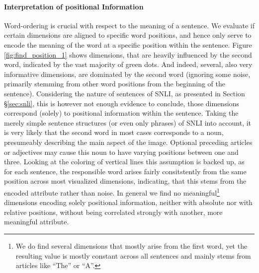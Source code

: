 \paragraph*{Interpretation of positional Information}
Word-ordering is crucial  with respect to the meaning of a sentence. We evaluate if certain dimensions are aligned to specific word positions, and hence only serve to encode the meaning of the word at a specific position within the sentence. Figure \ref{fig:find_position_1} shows dimensions, that are heavily influenced by the second word, indicated by the vast majority of green dots. And indeed, several, also very informative dimensions, are dominated by the second word (ignoring some noise, primarily stemming from other word positions from the beginning of the sentence). Considering the nature of sentences of \ac{SNLI}, as presented in Section §\ref{sec:snli}, this is however not enough evidence to conclude, those dimensions correspond (solely) to positional information within the sentence. Taking the merely simple sentence structures (or even only phrases) of \ac{SNLI} into account, it is very likely that the second word in most cases corresponds to a noun, presumeably describing the main aspect of the image. Optional preceding articles or adjectives may cause this noun to have varying positions between one and three. Looking at the coloring of vertical lines this assumption is backed up, as for each sentence, the responsible word arises fairly consitstently from the same position across most visualized dimensions, indicating, that this stems from the encoded attribute rather than noise. In general we find no meaningful\footnote{We do find several dimensions that mostly arise from the first word, yet the resulting value is mostly constant across all sentences and mainly stems from articles like ``The'' or ``A''.} dimensions encoding solely positional information, neither with absolute nor with relative positions, without being correlated strongly with another, more meaningful attribute.
